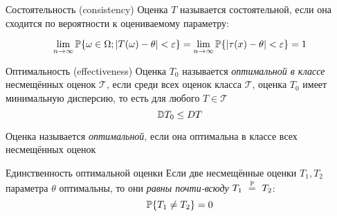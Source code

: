 \begin{dfn}{Состоятельность (consistency)}
Оценка $T$ называется состоятельной,
если она сходится по вероятности к оцениваемому параметру:

$$\lim_{n\to\infty}
    \mathbb P\{\omega\in\Omega; \left|T(\omega) - \theta\right| < \varepsilon \}
= \lim_{n\to\infty}
    \mathbb P\{\left|\tau(x) - \theta\right| < \varepsilon\}
= 1$$
\end{dfn}

\begin{dfn}{Оптимальность (effectiveness)}
Оценка $T_0$ называется \emph{оптимальной в классе} несмещённых оценок $\mathcal T$,
если среди всех оценок класса $\mathcal T$,
оценка $T_0$ имеет минимальную дисперсию,
то есть для любого $T\in\mathcal T$
$$\mathbb D T_0 \leq D T$$

Оценка называется \emph{оптимальной},
если она оптимальна в классе всех несмещённых оценок
\end{dfn}

\begin{thm}{Единственность оптимальной оценки}
Если две несмещённые оценки $T_1, T_2$ параметра $\theta$ оптимальны,
то они \emph{равны почти-всюду} $T_1~\overset{\mathbb P}{=}~T_2$:
  $$\mathbb P\{T_1\neq T_2\} = 0$$
\end{thm}

